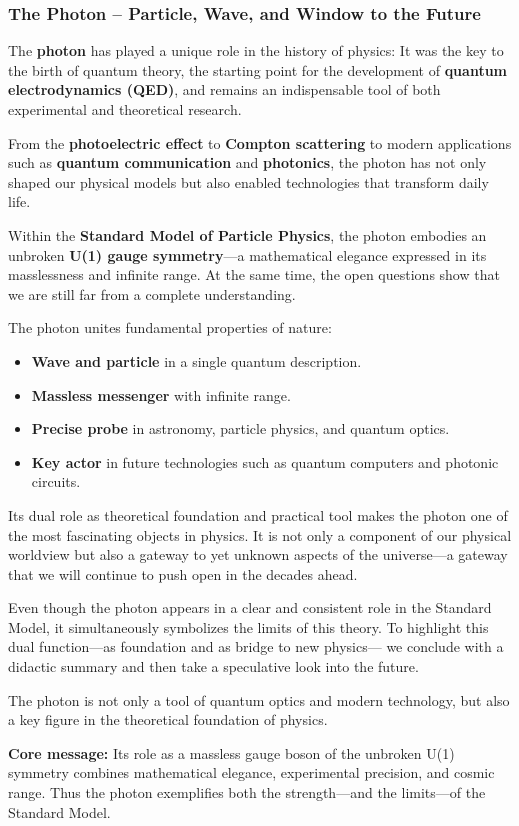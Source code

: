 \subsubsection*{The Photon – Particle, Wave, and Window to the Future}
The \textbf{photon} has played a unique role in the history of physics:  
It was the key to the birth of quantum theory, the starting point for the development of \textbf{quantum electrodynamics (QED)}, and remains an indispensable tool of both experimental and theoretical research.

From the \textbf{photoelectric effect} to \textbf{Compton scattering} to modern applications such as \textbf{quantum communication} and \textbf{photonics}, the photon has not only shaped our physical models but also enabled technologies that transform daily life.

Within the \textbf{Standard Model of Particle Physics}, the photon embodies an unbroken \textbf{U(1) gauge symmetry}—a mathematical elegance expressed in its masslessness and infinite range.  
At the same time, the open questions show that we are still far from a complete understanding.


The photon unites fundamental properties of nature:
\begin{itemize}
	\item \textbf{Wave and particle} in a single quantum description.
	\item \textbf{Massless messenger} with infinite range.
	\item \textbf{Precise probe} in astronomy, particle physics, and quantum optics.
	\item \textbf{Key actor} in future technologies such as quantum computers and photonic circuits.
\end{itemize}

Its dual role as theoretical foundation and practical tool makes the photon one of the most fascinating objects in physics.  
It is not only a component of our physical worldview but also a gateway to yet unknown aspects of the universe—a gateway that we will continue to push open in the decades ahead.

Even though the photon appears in a clear and consistent role in the Standard Model, 
it simultaneously symbolizes the limits of this theory.  
To highlight this dual function—as foundation and as bridge to new physics— 
we conclude with a didactic summary and then take a speculative look into the future.
\newpage
\noindent
\vspace{1em}
\begin{tcolorbox}[didaktikbox, title=Didactic conclusion: The photon in the Standard Model]
	\label{box:didaktik_kapVIII}
	The photon is not only a tool of quantum optics and modern technology, 
	but also a key figure in the theoretical foundation of physics.  
	
	\medskip
	\textbf{Core message:}  
	Its role as a massless gauge boson of the unbroken U(1) symmetry combines mathematical elegance, 
	experimental precision, and cosmic range.  
	Thus the photon exemplifies both the strength—and the limits—of the Standard Model.
\end{tcolorbox}

